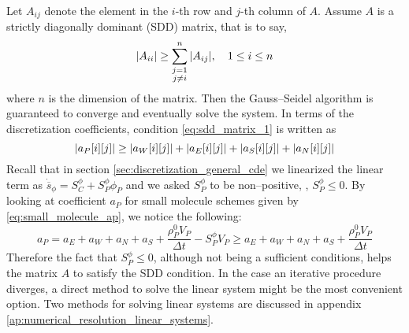 Let $A_{ij}$ denote the element in the $i$-th row and $j$-th column of $A$.
Assume $A$ is a strictly diagonally dominant (SDD) matrix, that is to say,
\begin{equation} \label{eq:sdd_matrix_1}
	\abs{A_{ii}} \geq 
	\sum_{\substack{j = 1 \\ j \neq i}}^n \abs{A_{ij}}, \quad 1 \leq i \leq n
\end{equation}
where $n$ is the dimension of the matrix. Then the Gauss--Seidel algorithm is
guaranteed to converge and eventually solve the system. In terms of the
discretization coefficients, condition \eqref{eq:sdd_matrix_1} is written as
\begin{equation*}
	\abs{a_P[i][j]} \geq 
	\abs{a_W[i][j]} +
	\abs{a_E[i][j]} +
	\abs{a_S[i][j]} +
	\abs{a_N[i][j]}
\end{equation*}
Recall that in section \ref{sec:discretization_general_cde} we linearized the
linear term as $\dot{\overline{s}}_\phi = S_C^\phi + S_P^\phi \phi_P$ and we
asked $S_P^\phi$ to be non--positive, \ie, $S_P^\phi \leq 0$. By looking at
coefficient $a_P$ for small molecule schemes given by
\eqref{eq:small_molecule_ap}, we notice the following:
\begin{equation*}
	a_P = 
	a_E + a_W + a_N + a_S + \frac{\rho_P^0 V_P}{\Delta t} - S_P^\phi V_P \geq
	a_E + a_W + a_N + a_S + \frac{\rho_P^0 V_P}{\Delta t}
\end{equation*}
Therefore the fact that $S_P^\phi \leq 0$, although not being a sufficient
conditions, helps the matrix $A$ to satisfy the SDD condition. In the case an
iterative procedure diverges, a direct method to solve the linear system might
be the most convenient option. Two methods for solving linear systems are
discussed in appendix \ref{ap:numerical_resolution_linear_systems}.
